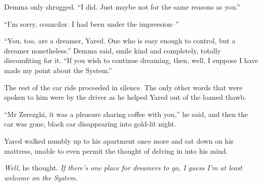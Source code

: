 Demma only shrugged. ``I did. Just maybe not for the same reasons as you.''

``I'm sorry, councilor. I had been under the impression--''

``You, too, are a dreamer, Yared. One who is easy enough to control, but a dreamer nonetheless.'' Demma said, smile kind and completely, totally discomfiting for it. ``If you wish to continue dreaming, then, well, I suppose I have made my point about the System.''

The rest of the car ride proceeded in silence. The only other words that were spoken to him were by the driver as he helped Yared out of the loaned thawb.

``Mr Zerezghi, it was a pleasure sharing coffee with you,'' he said, and then the car was gone, black car disappearing into gold-lit night.

Yared walked numbly up to his apartment once more and sat down on his mattress, unable to even permit the thought of delving in into his mind.

\emph{Well,} he thought. \emph{If there's one place for dreamers to go, I guess I'm at least welcome on the System.}
